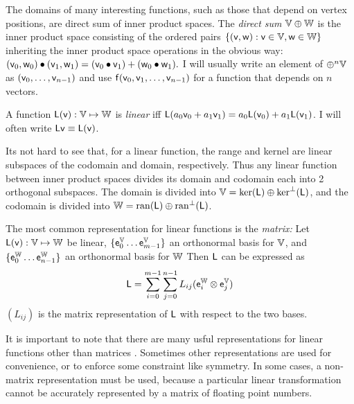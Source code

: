The domains of many interesting functions,
such as those that depend on vertex positions,
are direct sum of inner product spaces.
The {\it direct sum} $\mathbb{V} \oplus \mathbb{W}$ is the inner product space
consisting of the ordered pairs $\{ (\mathsf{v},\mathsf{w}) : \mathsf{v} \in \mathbb{V}, \mathsf{w} \in \mathbb{W} \}$
inheriting the inner product space operations in the obvious way:
$(\mathsf{v}_0,\mathsf{w}_0) \bullet (\mathsf{v}_1,\mathsf{w}_1) = (\mathsf{v}_0 \bullet \mathsf{v}_1) + (\mathsf{w}_0 \bullet \mathsf{w}_1).$
I will usually write an element of $\oplus^n \mathbb{V}$ as
$(\mathsf{v}_0,\ldots,\mathsf{v}_{n-1})$
and use
$\mathsf{f}(\mathsf{v}_0,\mathsf{v}_1,\ldots,\mathsf{v}_{n-1})$
for a function that depends on $n$ vectors.

\label{sec:linear-functions}

A function $\mathsf{L}(\mathsf{v}):\mathbb{V} \mapsto \mathbb{W}$
is {\it linear} iff
$\mathsf{L}(a_0 \mathsf{v}_0 + a_1 \mathsf{v}_1) = a_0 \mathsf{L}(\mathsf{v}_0) + a_1 \mathsf{L}(\mathsf{v}_1)$.
I will often write $\mathsf{L}\mathsf{v} \equiv \mathsf{L}(\mathsf{v})$.

Its not hard to see that, for a linear function,
the range and kernel are linear subspaces of the codomain and
domain, respectively.
Thus any linear function between inner product spaces
divides its domain and codomain each into 2 orthogonal subspaces.
The domain is divided into $\mathbb{V} = \mathrm{ker}(\mathsf{L}) \oplus \mathrm{ker}^{\perp}(\mathsf{L})$,
and the codomain is divided into $\mathbb{W} = \mathrm{ran}(\mathsf{L}) \oplus \mathrm{ran}^{\perp}(\mathsf{L})$.

The most common representation for linear functions is the {\it matrix:}
Let $\mathsf{L}(\mathsf{v}):\mathbb{V} \mapsto \mathbb{W}$ be linear,
$\{ \mathsf{e}_0^{\mathbb{V}} \ldots  \mathsf{e}_{m-1}^{\mathbb{V}} \}$ an orthonormal basis for $\mathbb{V}$,
and
$\{ \mathsf{e}_0^{\mathbb{W}} \ldots \mathsf{e}_{n-1}^{\mathbb{W}} \}$ an orthonormal  basis for $\mathbb{W}$
Then $\mathsf{L}$ can be expressed as
\begin{equation}
\mathsf{L}
 =
\sum_{i=0}^{m-1} \sum_{j=0}^{n-1} L_{ij} ( \mathsf{e}_i^{\mathbb{W}} \otimes \mathsf{e}_j^{\mathbb{V}} )
\end{equation}
$(L_{ij})$ is the matrix representation of $\mathsf{L}$ with respect to
the two bases\cite{halmos-1958}.

It is important to note that there are many usful
representations for linear functions other than matrices \cite{mcdonald-1989b}.
Sometimes other representations are used for convenience,
or to enforce some constraint like symmetry.
In some cases, a non-matrix representation must be used,
because a particular linear transformation
cannot be accurately represented by a matrix of floating point numbers.


